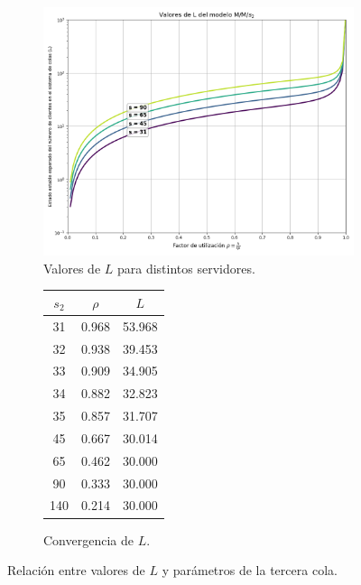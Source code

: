 \documentclass[10pt]{article}
\begin{document}
    \begin{figure}[!ht]
    	\centering
    	
    	\begin{subfigure}[c]{0.65\textwidth}
    		\centering
    		\includegraphics[width=\textwidth]{./images/rho-l-s2.png}
    		\caption{Valores de $L$ para distintos servidores.}
    		\label{fig:valores_s2}
    	\end{subfigure}
    	\begin{subfigure}[c]{0.3\textwidth}
    		\centering
    		\begin{tabular}{|c|c|c|}
    			\hline
    			$s_{2}$ & $\rho$ & $L$ \\
    			\hline
    			31 & 0.968 & 53.968 \\
    			32 & 0.938 & 39.453 \\
    			33 & 0.909 & 34.905 \\
    			34 & 0.882 & 32.823 \\
    			35 & 0.857 & 31.707 \\
    			45 & 0.667 & 30.014 \\
    			65 & 0.462 & 30.000 \\
    			90 & 0.333 & 30.000 \\
    			140 & 0.214 & 30.000 \\
    			\hline
    		\end{tabular}
    		\caption{Convergencia de $L$.}
    		\label{tab:s2_comp}
    	\end{subfigure}
    	\caption{Relación entre valores de $L$ y parámetros de la tercera cola.}
    	\label{fig:analisis_s2}
    \end{figure}
    
\end{document}
